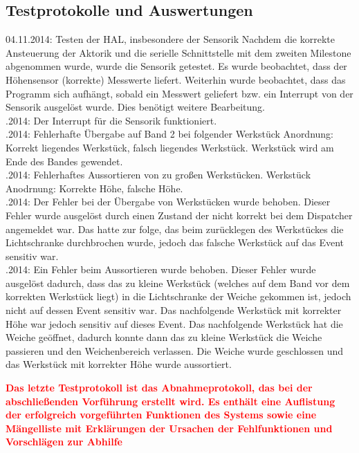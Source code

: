 \documentclass[oneside,a4paper,titlepage]{scrartcl} %
\begin{document}
\subsection{Testprotokolle und Auswertungen}
04.11.2014: Testen der HAL, insbesondere der Sensorik \newline
Nachdem die korrekte Ansteuerung der Aktorik und die serielle Schnittstelle mit dem zweiten Milestone abgenommen wurde, wurde die Sensorik getestet. Es wurde beobachtet, dass der Höhensensor (korrekte) Messwerte liefert. Weiterhin wurde beobachtet, dass das Programm sich aufhängt, sobald ein Messwert geliefert bzw. ein Interrupt von der Sensorik ausgelöst wurde. Dies benötigt weitere Bearbeitung.\\
.2014: Der Interrupt für die Sensorik funktioniert.\\
.2014: Fehlerhafte Übergabe auf Band 2 bei folgender Werkstück Anordnung: Korrekt liegendes Werkstück, falsch liegendes Werkstück. Werkstück wird am Ende des Bandes gewendet.\\
.2014: Fehlerhaftes Aussortieren von zu großen Werkstücken. Werkstück Anodrnung: Korrekte Höhe, falsche Höhe.\\
.2014: Der Fehler bei der Übergabe von Werkstücken wurde behoben. Dieser Fehler wurde ausgelöst durch einen Zustand der nicht korrekt bei dem Dispatcher
angemeldet war. Das hatte zur folge, das beim zurücklegen des Werkstückes die Lichtschranke durchbrochen wurde, jedoch das falsche Werkstück auf das Event sensitiv war.\\
.2014: Ein Fehler beim Aussortieren wurde behoben. Dieser Fehler wurde ausgelöst dadurch, dass das zu kleine Werkstück (welches auf dem Band vor dem korrekten Werkstück liegt)
in die Lichtschranke der Weiche gekommen ist, jedoch nicht auf dessen Event sensitiv war. Das nachfolgende Werkstück mit korrekter Höhe war jedoch sensitiv auf dieses Event.
Das nachfolgende Werkstück hat die Weiche geöffnet, dadurch konnte dann das zu kleine Werkstück die Weiche passieren und den Weichenbereich verlassen. Die Weiche wurde geschlossen
und das Werkstück mit korrekter Höhe wurde aussortiert.\\
\newline

\textcolor{red}{\textbf{
Das letzte Testprotokoll ist das Abnahmeprotokoll, das bei der abschließenden Vorführung erstellt
wird. Es enthält eine Auflistung der erfolgreich vorgeführten Funktionen des Systems sowie eine
Mängelliste mit Erklärungen der Ursachen der Fehlfunktionen und Vorschlägen zur Abhilfe}}
\end{document}
